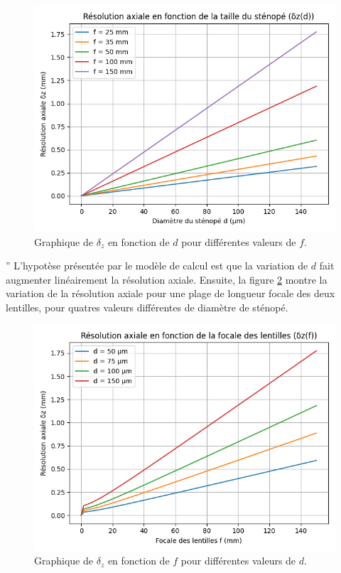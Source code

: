 \documentclass[11pt,letterpaper]{article}
\begin{document}
\begin{figure}[H]
  \centering
  \includegraphics[scale=0.7]{res_vs_pinhole.png}
  \caption{Graphique de $\delta_{z}$ en fonction de $d$ pour différentes valeurs de $f$.}
  \label{respin}
\end{figure}
''
L'hypotèse présentée par le modèle de calcul est que la variation de $d$ fait augmenter linéairement la résolution axiale. Ensuite, la figure \ref{resfoc} montre la variation de la résolution axiale pour une plage de longueur focale des deux lentilles, pour quatres valeurs différentes de diamètre de sténopé.
\begin{figure}[H]
  \centering
  \includegraphics[scale=0.7]{res_vs_focal.png}
  \caption{Graphique de $\delta_{z}$ en fonction de $f$ pour différentes valeurs de $d$.}
  \label{resfoc}
\end{figure}
\end{document}
